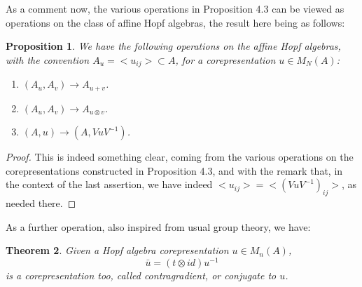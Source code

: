 \documentclass[12pt]{amsbook}
\newtheorem{theorem}{Theorem}[chapter]
\newtheorem{proposition}[theorem]{Proposition}
\begin{document}
As a comment now, the various operations in Proposition 4.3 can be viewed as operations on the class of affine Hopf algebras, the result here being as follows:

\begin{proposition}
We have the following operations on the affine Hopf algebras, with the convention $A_u=<u_{ij}>\subset A$, for a corepresentation $u\in M_N(A)$:
\begin{enumerate}
\item $(A_u,A_v)\to A_{u+v}$.

\item $(A_u,A_v)\to A_{u\otimes v}$.

\item $(A,u)\to(A,VuV^{-1})$.
\end{enumerate}
\end{proposition}

\begin{proof}
This is indeed something clear, coming from the various operations on the corepresentations constructed in Proposition 4.3, and with the remark that, in the context of the last assertion, we have indeed $<u_{ij}>=<(VuV^{-1})_{ij}>$, as needed there.
\end{proof}

As a further operation, also inspired from usual group theory, we have:


\begin{theorem}
Given a Hopf algebra corepresentation $u\in M_n(A)$,
$$\bar{u}=(t\otimes id)u^{-1}$$
is a corepresentation too, called contragradient, or conjugate to $u$.
\end{theorem}
\end{document}
